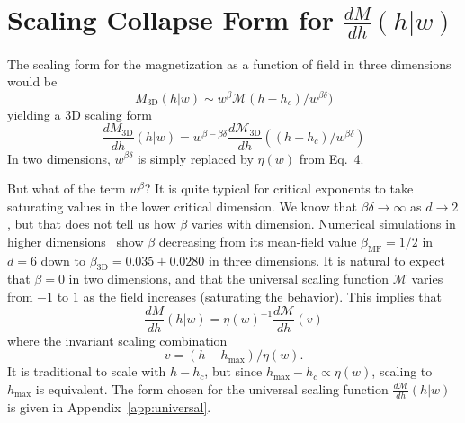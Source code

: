 \documentclass[reprint,amsmath,amssymb,aps,floatfix]{revtex4-1}
\begin{document}
\section{\label{app:magscale} Scaling Collapse Form for $\frac{dM}{dh}(h|w)$}
The scaling form for the magnetization as a function of field in three dimensions would be 
%
\begin{equation}
	M_{\textrm{3D}}(h|w) \sim w^\beta \mathcal{M}(h-h_c)/w^{\beta\delta})
\end{equation}
%
\noindent yielding a 3D scaling form 
%
\begin{equation}
	\frac{dM_{\textrm{3D}}}{dh}(h|w) =w^{\beta-\beta\delta} \frac{d\mathcal{M}_{\textrm{3D}}}{dh}((h-h_c)/w^{\beta\delta})
\end{equation}
%
\noindent In two dimensions, $w^{\beta\delta}$ is simply replaced by $\eta(w)$ from Eq.~4.\par
%
But what of the term $w^\beta$? It is quite typical for critical exponents to take saturating values in the lower critical dimension. We know that $\beta\delta \to \infty$ as $d\to 2$, but that does not tell us how $\beta$ varies with dimension. Numerical simulations in higher dimensions~\cite{Perkovic96} show $\beta$ decreasing from its mean-field value $\beta_{\textrm{MF}}=1/2$ in $d=6$ down to $\beta_{\textrm{3D}} = 0.035 \pm 0.0280$ in three dimensions. It is natural to expect that $\beta = 0$ in two dimensions, and that the universal scaling function $\mathcal{M}$ varies from $-1$ to $1$ as the field increases (saturating the behavior). This implies that
%
\begin{equation}
	\frac{dM}{dh}(h|w)=\eta(w)^{-1}\frac{d\mathcal{M}}{dh}(v)
\end{equation}
%
\noindent where the invariant scaling combination
%
\begin{equation}
	v = (h-h_{\textrm{max}})/\eta(w).
\end{equation}
%
\noindent It is traditional to scale with $h-h_c$, but since $h_{\textrm{max}}-h_c\propto \eta(w)$, scaling to $h_{\textrm{max}}$ is equivalent. The form chosen for the universal scaling function $\frac{d\mathcal{M}}{dh}(h|w)$ is given in Appendix~\ref{app:universal}.
\end{document}
